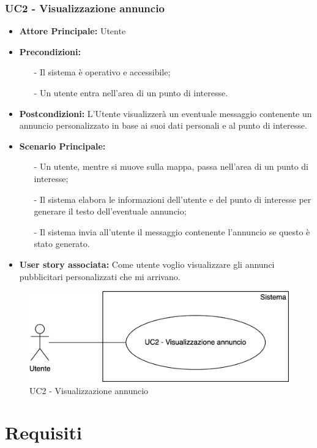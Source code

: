 \documentclass[11pt]{article}
\begin{document}
\begin{justify}
\subsubsection{\textbf{UC2 - Visualizzazione annuncio}}
\begin{itemize}
	\item \textbf{Attore Principale:} Utente
    \item \textbf{Precondizioni:} 
    	\begin{itemize}
    		\item [-] Il sistema è operativo e accessibile;
    		\item [-] Un utente entra nell'area di un punto di interesse.
    	\end{itemize}
    \item \textbf{Postcondizioni:} L'Utente visualizzerà un eventuale messaggio contenente un annuncio personalizzato in base 
    ai suoi dati personali e al punto di interesse.
    \item \textbf{Scenario Principale:} 
    \begin{itemize}
    		\item [-] Un utente, mentre si muove sulla mappa, passa nell'area di un punto di interesse;
    		\item [-] Il sistema elabora le informazioni dell'utente e del punto di interesse per generare il testo 
            dell'eventuale annuncio;
    		\item [-] Il sistema invia all'utente il messaggio contenente l'annuncio se questo è stato generato.
	\end{itemize}
    \item \textbf{User story associata:} Come utente voglio visualizzare gli annunci pubblicitari personalizzati che 
    mi arrivano.
\end{itemize}
\begin{figure}[ht]
    \centering
    \includegraphics[width=0.5\linewidth]{UC2image.png}
    \caption{UC2 - Visualizzazione annuncio}
    \label{fig:UC2}
\end{figure}


\newpage
\section{Requisiti}


\end{justify}
\end{document}
